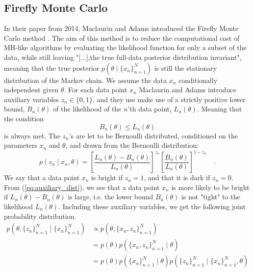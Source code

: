 \documentclass{article}
\theoremstyle{definition}
\begin{document}
\subsection{Firefly Monte Carlo}\label{sec:Firefly}
In their paper from 2014, Maclaurin and Adams  introduced the Firefly Monte Carlo method \cite{Maclaurin:1}. 
The aim of this method is to reduce the computational cost of MH-like algorithms by evaluating the likelihood function for only a subset of the data, while still leaving "[...],the true full-data posterior distribution invariant", meaning that the true posterior $p(\theta\mid\{x_n\}_{n=1}^N)$ is still the stationary distribution of the Markov chain.
We assume the data $x_n$ conditionally independent given $\theta$.
For each data point $x_n$ Maclaurin and Adams introduce auxiliary variables $z_n \in \{0, 1\}$, and they use make use of a strictly positive lower bound, $B_n\left(\theta\right)$ of the likelihood of the $n$'th data point, $L_n\left(\theta\right)$.  Meaning that the condition 
\begin{equation}
    B_n\left(\theta\right) \leq L_n\left(\theta\right)
\end{equation} is always met. 
The $z_n$'s are let to be Bernoulli distributed, conditioned on the parameters $x_n$ and $\theta$, 
and drawn from the  Bernoulli distribution:
\begin{equation}\label{eq:auxiliary_dist}
    p(z_n\mid x_n,\theta) = \left[\frac{L_n(\theta) - B_n(\theta)}{L_n(\theta)}\right]^{z_n}\left[\frac{B_n(\theta)}{L_n(\theta)}\right]^{1-z_n} \quad .
\end{equation}
We say that a data point $x_n$ is bright if $z_n = 1$, and that it is dark if $z_n = 0$. 
From (\ref{eq:auxiliary_dist}), we see that a data point $x_n$ is more likely to be bright if $L_n(\theta) - B_n(\theta)$ is large, i.e. the lower bound $B_n(\theta)$ is not "tight" to the likelihood $L_n(\theta)$. Including these auxiliary variables, we get the following joint probability distribution. 
\begin{equation*}
\begin{split}
     p(\theta, \{z_n\}_{n=1}^N\mid\{x_n\}_{n=1}^N) &\propto p(\theta, \{x_n, z_n\}_{n = 1}^N) \\
     &= p(\theta) p(\{x_n, z_n\}_{n=1}^N\mid\theta) \\
     & = p(\theta)p(\{x_n\}_{n=1}^N\mid\theta)p(\{z_n\}_{n=1}^N\mid \{x_n\}_{n=1}^N, \theta)
\end{split}
\end{equation*}{}
\end{document}

